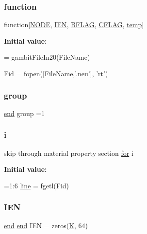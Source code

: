 \subsubsection{\texorpdfstring{function}{function}}
{\footnotesize\ttfamily function\mbox{[}\hyperlink{a00605_a28010846a3742b3c2c07f00b1f1536ff}{N\+O\+DE}, \hyperlink{a00608_ada37e689768b959686f183a3d534464b}{I\+EN}, \hyperlink{a00608_a2631e3df74fb2c7ff87a8ab5c4dabd4b}{B\+F\+L\+AG}, \hyperlink{a00608_a10675f132896e92909100dff33d2eca1}{C\+F\+L\+AG}, \hyperlink{a00608_a66be333d3079c1ecfec40ed090608507}{temp}\mbox{]}}

{\bfseries Initial value\+:}
\begin{DoxyCode}
= gambitFileIn20(FileName)

Fid = fopen([FileName,\textcolor{stringliteral}{'.neu'}], \textcolor{stringliteral}{'rt'})
\end{DoxyCode}
\mbox{\label{a00608_a13dcc74bebe8895ff73eeb1234135704}} 
\subsubsection{\texorpdfstring{group}{group}}
{\footnotesize\ttfamily \hyperlink{a00608_afb358f48b1646c750fb9da6c6585be2b}{end} group =1}

\mbox{\label{a00608_afb6aca53df96564f2adf086c942453ec}} 
\subsubsection{\texorpdfstring{i}{i}}
{\footnotesize\ttfamily skip through material property section \hyperlink{a00623_ad1e7380d51df1e0043d24d3c8a860e0a}{for} i}

{\bfseries Initial value\+:}
\begin{DoxyCode}
=1:6
    \hyperlink{a00608_a1d1b0d42391bd99b4214d9216b163807}{line} = fgetl(Fid)
\end{DoxyCode}
\mbox{\label{a00608_ab08108f8909c2d9138c9e93413f7b6b9}} 
\subsubsection{\texorpdfstring{I\+EN}{IEN}}
{\footnotesize\ttfamily \hyperlink{a00608_afb358f48b1646c750fb9da6c6585be2b}{end} \hyperlink{a00608_afb358f48b1646c750fb9da6c6585be2b}{end} I\+EN = zeros(\hyperlink{a00608_a16e4ef534cec559430e07e05eb71c719}{K}, 64)}


